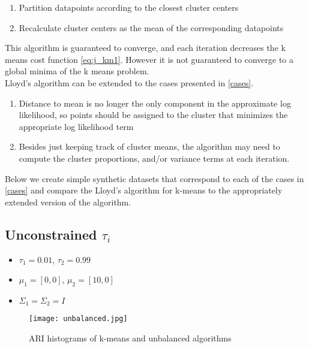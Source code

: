 \documentclass{article}
\begin{document}
\begin{enumerate}
\item Partition datapoints according to the closest cluster centers
\item Recalculate cluster centers as the mean of the corresponding datapoints
\end{enumerate} 

\noindent 
\quad This algorithm is guaranteed to converge, and each iteration decreases the k means cost function \eqref{eq:j_km1}. However it is not guaranteed to converge to a global minima of the k means problem. \\ \null \quad
Lloyd's algorithm can be extended to the cases presented in \ref{cases}. 
\begin{enumerate} 
\item Distance to mean is no longer the only component in the approximate log likelihood, so points should be assigned to the cluster that minimizes the appropriate log likelihood term
\item Besides just keeping track of cluster means, the algorithm may need to compute the cluster proportions, and/or variance terms at each iteration.
\end{enumerate}
\noindent \quad Below we create simple synthetic datasets that correspond to each of the cases in \ref{cases} and compare the Lloyd's algorithm for k-means to the appropriately extended version of the algorithm.

\subsection{Unconstrained $\tau_i$} 

\begin{itemize}
\item $\tau_1 = 0.01$, $\tau_2 = 0.99$
\item $\mu_1 = [0,0]$, $\mu_2 = [10,0]$
\item $\Sigma_1=\Sigma_2=I$
\end{itemize}

\begin{figure}
\centering
\texttt{[image: unbalanced.jpg]}
\caption{ARI histograms of k-means and unbalanced algorithms}
\end{figure}

\begin{comment}
\subsection{ $\Sigma_i=v_iI$} 

\begin{itemize}
\item $\tau_1 = 0.5$, $\tau_2 = 0.5$
\item $\mu_1 = [0,0]$, $\mu_2 = [10,0]$
\item $\Sigma_1=0.1I$, $\Sigma_2=7I$
\end{itemize}

\begin{figure}
\centering
\texttt{[image: spheres.jpg]}
\caption{ARI histograms of k-means and spheres algorithms}
\end{figure}
\end{comment}
\end{document}
